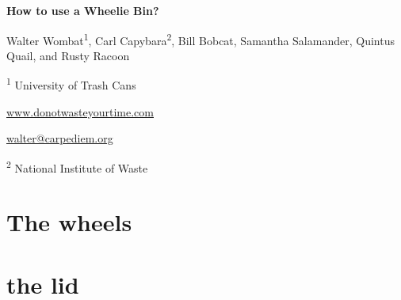 \documentclass{article}
\begin{document}
\begin{center}
{\Huge\bfseries How to use a Wheelie Bin?\par\vspace{2\baselineskip}}
Walter Wombat\textsuperscript{1}, Carl Capybara\textsuperscript{2}, Bill Bobcat, Samantha Salamander, Quintus Quail, and Rusty Racoon
\par\vspace{\baselineskip}
\textsuperscript{1} University of Trash Cans\par \url{www.donotwasteyourtime.com}\par \url{walter@carpediem.org}\par
\textsuperscript{2} National Institute of Waste
\end{center}
\tableofcontents
\section{The wheels}
\section{the lid}
\end{document}
